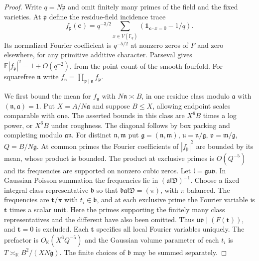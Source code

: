 \documentclass[11pt,letterpaper]{article}
\theoremstyle{definition}
\numberwithin{equation}{section}
\begin{document}
\begin{proof}
Write $q=N\mathfrak p$ and omit finitely many primes of the field
and the fixed varieties. At $\mathfrak p$ define the residue-field
incidence trace
\[
 f_{\mathfrak p}(\mathbf c)=q^{-3/2}\sum_{x\in V(\mathbb F_q)}
                   (\mathbf1_{\mathbf c\cdot x=0}-1/q).
\]
Its normalized Fourier coefficient is $q^{-5/2}$ at nonzero
zeros of $F$ and zero elsewhere, for any primitive additive
character. Parseval gives
$\mathbb E|f_{\mathfrak p}|^2=1+O(q^{-2})$, from the point count
of the smooth fourfold. For squarefree $\mathfrak n$ write
$f_{\mathfrak n}=\prod_{\mathfrak p\mid\mathfrak n} f_{\mathfrak p}$.

We first bound the mean for $f_{\mathfrak n}$ with
$N\mathfrak n\asymp B$, in one residue class modulo
$\mathfrak a$ with $(\mathfrak n,\mathfrak a)=1$. Put
$X=A/N\mathfrak a$ and suppose $B\le X$, allowing endpoint
scales comparable with one. The asserted bounds in this class are
$X^6B$ times a log power, or $X^6B$ under roughness. The diagonal
follows by box packing and completing modulo $\mathfrak a\mathfrak n$.
For distinct $\mathfrak n,\mathfrak m$ put
$\mathfrak g=(\mathfrak n,\mathfrak m)$,
$\mathfrak u=\mathfrak n/\mathfrak g$,
$\mathfrak v=\mathfrak m/\mathfrak g$, $Q=B/N\mathfrak g$.
At common primes the Fourier coefficients of $|f_{\mathfrak p}|^2$
are bounded by its mean, whose product is bounded. The product at
exclusive primes is $O(Q^{-5})$ and its frequencies are supported
on nonzero cubic zeros. Let
$\mathfrak l=\mathfrak g\mathfrak u\mathfrak v$.
In Gaussian Poisson summation the frequencies lie in
$(\mathfrak a\mathfrak l\mathfrak D)^{-1}$. Choose a fixed integral
class representative $\mathfrak b$ so that
$\mathfrak b\mathfrak a\mathfrak l\mathfrak D=(\pi)$, with $\pi$
balanced. The frequencies are $\mathbf t/\pi$ with $t_i\in\mathfrak b$,
and at each exclusive prime the Fourier variable is $\mathbf t$
times a scalar unit. Here the primes supporting the finitely many
class representatives and the different have also been omitted.
Thus $\mathfrak u\mathfrak v\mid (F(\mathbf t))$, and $\mathbf t=0$
is excluded. Each $\mathbf t$ specifies all local Fourier variables
uniquely. The prefactor is $O_{\mathbb K}(X^6 Q^{-5})$ and the
Gaussian volume parameter of each $t_i$ is
$T\asymp_{\mathbb K}B^2/(X N\mathfrak g)$. The finite choices of
$\mathfrak b$ may be summed separately.


\end{proof}
\end{document}
